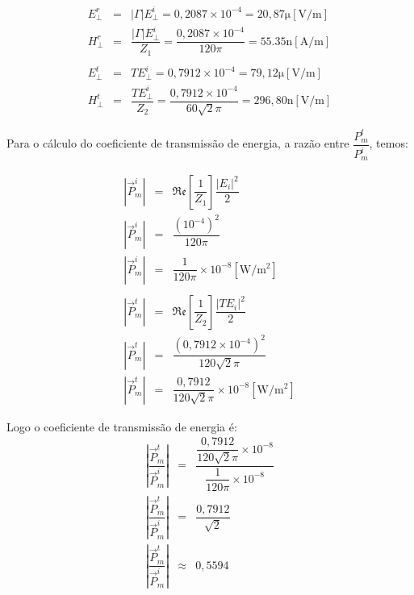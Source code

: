 \begin{enumerate}[1.]
\begin{eqnarray*}
E^{r}_{\perp} & = & |\Gamma| E^{i}_{\perp} = 0,2087 \times 10^{-4} = 20,87\si{\micro}[\si{\volt/\meter}] \nonumber \\
H^{r}_{\perp} & = & \dfrac{|\Gamma| E^{i}_{\perp}}{Z_{1}} = \dfrac{0,2087 \times 10^{-4}}{120\pi} = 55.35\si{\nano}[\si{\ampere/\meter}]\nonumber \\
& & \\
E^{t}_{\perp} & = & T E^{i}_{\perp} = 0,7912 \times 10^{-4} = 79,12\si{\micro}[\si{\volt/\meter}]\nonumber \\
H^{t}_{\perp} & = & \dfrac{T E^{i}_{\perp}}{Z_{2}} = \dfrac{0,7912 \times 10^{-4}}{60\sqrt{2}\pi} = 296,80\si{\nano}[\si{\volt/\meter}]
\end{eqnarray*}

Para o cálculo do coeficiente de transmissão de energia, a razão entre $\dfrac{P^{t}_{m}}{P^{i}_{m}}$, temos:

\begin{eqnarray*}
|\vec{P}_{m}^{i}| & = & \mathfrak{Re}\left[\dfrac{1}{Z_{1}}\right] \dfrac{|E_{i}|^2}{2} \\
|\vec{P}_{m}^{i}| & = & \dfrac{(10^{-4})^{2}}{120\pi} \\
|\vec{P}_{m}^{i}| & = & \dfrac{1}{120\pi} \times 10^{-8} [\si{\watt/\meter^{2}}] \\
& & \\
|\vec{P}_{m}^{t}| & = & \mathfrak{Re}\left[\dfrac{1}{Z_{2}}\right] \dfrac{|T E_{i}|^2}{2} \\
|\vec{P}_{m}^{t}| & = & \dfrac{(0,7912 \times 10^{-4})^{2}}{120\sqrt{2}\pi} \\
|\vec{P}_{m}^{t}| & = & \dfrac{0,7912}{120\sqrt{2}\pi} \times 10^{-8} [\si{\watt/\meter^{2}}]
\end{eqnarray*}

Logo o coeficiente de transmissão de energia é:
\begin{eqnarray*}
\left|\dfrac{\vec{P}_{m}^{t}}{\vec{P}_{m}^{i}}\right| & = & \dfrac{\dfrac{0,7912}{120\sqrt{2}\pi} \times 10^{-8}}{\dfrac{1}{120\pi} \times 10^{-8}} \\
\left|\dfrac{\vec{P}_{m}^{t}}{\vec{P}_{m}^{i}}\right| & = & \dfrac{0,7912}{\sqrt{2}} \\
\left|\dfrac{\vec{P}_{m}^{t}}{\vec{P}_{m}^{i}}\right| & \approx & 0,5594
\end{eqnarray*}

\end{enumerate}
 

